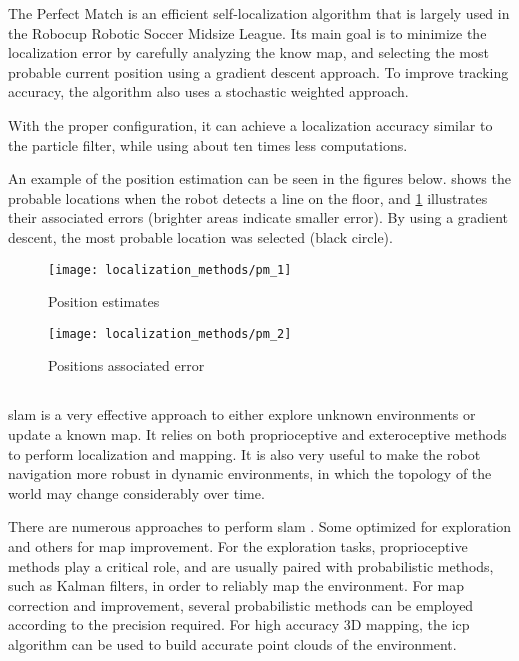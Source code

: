 The Perfect Match \cite{Lauer2006a,Pinto1963} is an efficient self-localization algorithm that is largely used in the Robocup Robotic Soccer Midsize League. Its main goal is to minimize the localization error by carefully analyzing the know map, and selecting the most probable current position using a gradient descent approach. To improve tracking accuracy, the algorithm also uses a stochastic weighted approach.

With the proper configuration, it can achieve a localization accuracy similar to the particle filter, while using about ten times less computations.

An example of the position estimation can be seen in the figures below.  shows the probable locations when the robot detects a line on the floor, and \cref{fig:localization-methods_pm-2} illustrates their associated errors (brighter areas indicate smaller error). By using a gradient descent, the most probable location was selected (black circle).

\begin{figure}[h]
	\centering
	\begin{minipage}[h]{.495\textwidth}
		\centering
		\texttt{[image: localization\_methods/pm\_1]}
		\caption{Position estimates}
		\label{fig:localization-methods_pm-1}
	\end{minipage}\hfill
	\begin{minipage}[h]{.495\textwidth}
		\centering
		\texttt{[image: localization\_methods/pm\_2]}
		\caption{Positions associated error}
		\label{fig:localization-methods_pm-2}
	\end{minipage}
\end{figure}


\subsection{}

\gls{slam} \cite{Thrun2002} is a very effective approach to either explore unknown environments or update a known map. It relies on both proprioceptive and exteroceptive methods to perform localization and mapping. It is also very useful to make the robot navigation more robust in dynamic environments, in which the topology of the world may change considerably over time.

There are numerous approaches to perform  \gls{slam} \cite{Tuna2012}. Some optimized for exploration and others for map improvement. For the exploration tasks, proprioceptive methods play a critical role, and are usually paired with probabilistic methods, such as Kalman filters, in order to reliably map the environment. For map correction and improvement, several probabilistic methods can be employed according to the precision required. For high accuracy 3D mapping, the \gls{icp} algorithm can be used to build accurate point clouds of the environment.



